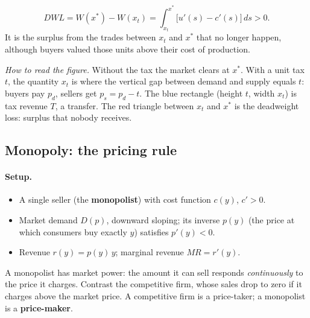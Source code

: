 \begin{keybox}[title=Deadweight loss]
\[
DWL=W(x^*)-W(x_t)=\int_{x_t}^{x^*}\big[u'(s)-c'(s)\big]\,ds>0 .
\]
It is the surplus from the trades between $x_t$ and $x^*$ that no longer happen, although buyers valued those units above their cost of production.
\end{keybox}

\begin{center}
\end{center}
\textit{How to read the figure.} Without the tax the market clears at $x^*$. With a unit tax $t$, the quantity $x_t$ is where the vertical gap between demand and supply equals $t$: buyers pay $p_d$, sellers get $p_s=p_d-t$. The blue rectangle (height $t$, width $x_t$) is tax revenue $T$, a transfer. The red triangle between $x_t$ and $x^*$ is the deadweight loss: surplus that nobody receives.

\subsection{Monopoly: the pricing rule }

\paragraph{Setup.}
\begin{itemize}
\item A single seller (the \textbf{monopolist}) with cost function $c(y)$, $c'>0$.
\item Market demand $D(p)$, downward sloping; its inverse $p(y)$ (the price at which consumers buy exactly $y$) satisfies $p'(y)<0$.
\item Revenue $r(y)=p(y)\,y$; marginal revenue $MR=r'(y)$.
\end{itemize}
A monopolist has market power: the amount it can sell responds \emph{continuously} to the price it charges. Contrast the competitive firm, whose sales drop to zero if it charges above the market price. A competitive firm is a price-taker; a monopolist is a \textbf{price-maker}.

